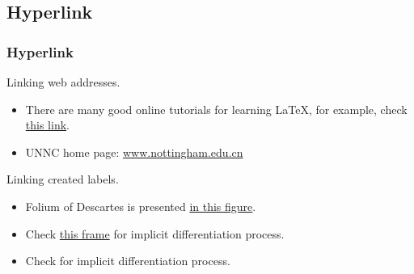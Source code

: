 \documentclass{beamer}
\begin{document}
\subsection{Hyperlink}
\begin{frame}
\frametitle{Hyperlink}

Linking web addresses.\\
\begin{itemize}
\item
There are many good online tutorials for learning \LaTeX, for example, check \href{https://www.overleaf.com/learn/latex/Learn_LaTeX_in_30_minutes}{this link}.\\
\item
UNNC home page: \url{www.nottingham.edu.cn} 
\end{itemize}
\vspace{1cm}

\pause

Linking created labels.\\
\begin{itemize}
\item<2-> %
Folium of Descartes is presented \hyperlink{fig1}{in this figure}.

\item<3-> %
Check \hyperlink{frame1}{this frame} for implicit differentiation process.

\item<4-> %
Check \hyperlink{frame1}{} for implicit differentiation process.
\end{itemize}


\end{frame}
\end{document}
